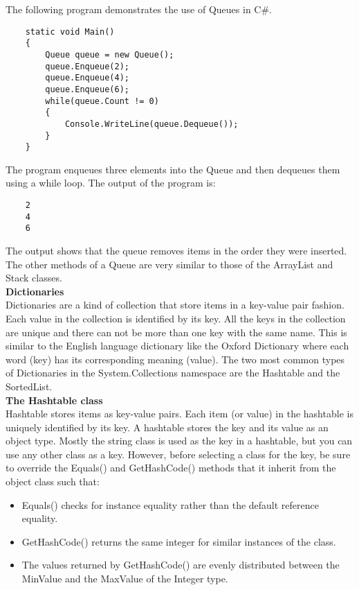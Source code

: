 The following program demonstrates the use of Queues in C\#.

\begin{lstlisting}
    static void Main()
    {
        Queue queue = new Queue();
        queue.Enqueue(2);
        queue.Enqueue(4);
        queue.Enqueue(6);
        while(queue.Count != 0)
        {
            Console.WriteLine(queue.Dequeue());
        }
    }    
\end{lstlisting}

The program enqueues three elements into the Queue and then dequeues them using a while loop. The output of the
program is:

\begin{lstlisting}
    2
    4
    6        
\end{lstlisting}

The output shows that the queue removes items in the order they were inserted. The other methods of a Queue are
very similar to those of the ArrayList and Stack classes.\\

\textbf{Dictionaries}\\

Dictionaries are a kind of collection that store items in a key-value pair fashion. Each value in the collection is
identified by its key. All the keys in the collection are unique and there can not be more than one key with the same
name. This is similar to the English language dictionary like the Oxford Dictionary where each word (key) has its
corresponding meaning (value). The two most common types of Dictionaries in the System.Collections namespace
are the Hashtable and the SortedList.\\

\textbf{The Hashtable class}\\

Hashtable stores items as key-value pairs. Each item (or value) in the hashtable is uniquely identified by its key. A
hashtable stores the key and its value as an object type. Mostly the string class is used as the key in a hashtable, but
you can use any other class as a key. However, before selecting a class for the key, be sure to override the Equals()
and GetHashCode() methods that it inherit from the object class such that:

\begin{itemize}
    \item Equals() checks for instance equality rather than the default reference equality.
    \item GetHashCode() returns the same integer for similar instances of the class.
    \item The values returned by GetHashCode() are evenly distributed between the MinValue and the MaxValue
    of the Integer type. 
\end{itemize}

